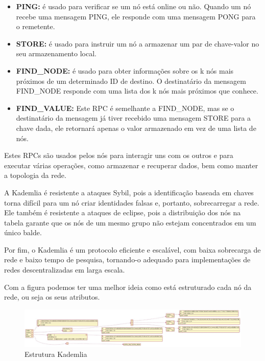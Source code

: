 \documentclass[conference]{IEEEtran}
\begin{document}
    \begin{itemize}
        \item \textbf{PING:} é usado para verificar se um nó está online ou não. Quando um nó recebe uma mensagem PING, ele responde com uma mensagem PONG para o remetente.
        \item \textbf{STORE:} é usado para instruir um nó a armazenar um par de chave-valor no seu armazenamento local.
        \item \textbf{FIND\_NODE:} é usado para obter informações sobre os k nós mais próximos de um determinado ID de destino. O destinatário da mensagem FIND\_NODE responde com uma lista dos k nós mais próximos que conhece.
        \item \textbf{FIND\_VALUE:} Este RPC é semelhante a FIND\_NODE, mas se o destinatário da mensagem já tiver recebido uma mensagem STORE para a chave dada, ele retornará apenas o valor armazenado em vez de uma lista de nós.
    \end{itemize}
    Estes RPCs são usados pelos nós para interagir uns com os outros e para executar várias operações, como armazenar e recuperar dados, bem como manter a topologia da rede.


    A Kademlia é resistente a ataques Sybil, pois a identificação baseada em chaves torna difícil para um nó criar identidades falsas e, portanto, sobrecarregar a rede. Ele também é resistente a ataques de eclipse, pois a distribuição dos nós na tabela garante que os nós de um mesmo grupo não estejam concentrados em um único balde.

    Por fim, o Kademlia é um protocolo eficiente e escalável, com baixa sobrecarga de rede e baixo tempo de pesquisa, tornando-o adequado para implementações de redes descentralizadas em larga escala.

    Com a figura \cite{1} podemos ter uma melhor ideia como está estruturado cada nó da rede, ou seja os seus atributos.

    \begin{figure}[H]
        \centering
        \includegraphics[scale=0.25]{images/kademlia-estrutura.jpeg}
        \caption{Estrutura Kademlia \cite{1}}
        \label{fig:Estrutura Kademlia}
    \end{figure}
\end{document}
